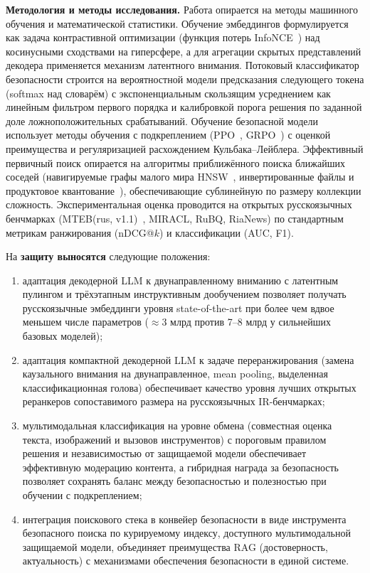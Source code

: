 \textbf{Методология и методы исследования.} Работа опирается на методы машинного обучения и математической статистики. Обучение эмбеддингов формулируется как задача контрастивной оптимизации (функция потерь InfoNCE~\cite{oord2019representation}) над косинусными сходствами на гиперсфере, а для агрегации скрытых представлений декодера применяется механизм латентного внимания. Потоковый классификатор безопасности строится на вероятностной модели предсказания следующего токена (softmax над словарём) с экспоненциальным скользящим усреднением как линейным фильтром первого порядка и калибровкой порога решения по заданной доле ложноположительных срабатываний. Обучение безопасной модели использует методы обучения с подкреплением (PPO~\cite{schulman2017ppo}, GRPO~\cite{shao2024deepseekmath}) с оценкой преимущества и регуляризацией расхождением Кульбака--Лейблера. Эффективный первичный поиск опирается на алгоритмы приближённого поиска ближайших соседей (навигируемые графы малого мира HNSW~\cite{malkov2018hnsw}, инвертированные файлы и продуктовое квантование~\cite{johnson2019faiss}), обеспечивающие сублинейную по размеру коллекции сложность. Экспериментальная оценка проводится на открытых русскоязычных бенчмарках (MTEB(rus, v1.1)~\cite{snegirev2025rumteb}, MIRACL, RuBQ, RiaNews) по стандартным метрикам ранжирования (nDCG@$k$) и классификации (AUC, F1).

На \textbf{защиту выносятся} следующие положения:
\begin{enumerate}
    \item адаптация декодерной LLM к двунаправленному вниманию с латентным пулингом и трёхэтапным инструктивным дообучением позволяет получать русскоязычные эмбеддинги уровня state-of-the-art при более чем вдвое меньшем числе параметров ($\approx$3 млрд против 7--8 млрд у сильнейших базовых моделей);
    \item адаптация компактной декодерной LLM к задаче переранжирования (замена каузального внимания на двунаправленное, mean pooling, выделенная классификационная голова) обеспечивает качество уровня лучших открытых реранкеров сопоставимого размера на русскоязычных IR-бенчмарках;
    \item мультимодальная классификация на уровне обмена (совместная оценка текста, изображений и вызовов инструментов) с пороговым правилом решения и независимостью от защищаемой модели обеспечивает эффективную модерацию контента, а гибридная награда за безопасность позволяет сохранять баланс между безопасностью и полезностью при обучении с подкреплением;
    \item интеграция поискового стека в конвейер безопасности в виде инструмента безопасного поиска по курируемому индексу, доступного мультимодальной защищаемой модели, объединяет преимущества RAG (достоверность, актуальность) с механизмами обеспечения безопасности в единой системе.
\end{enumerate}

